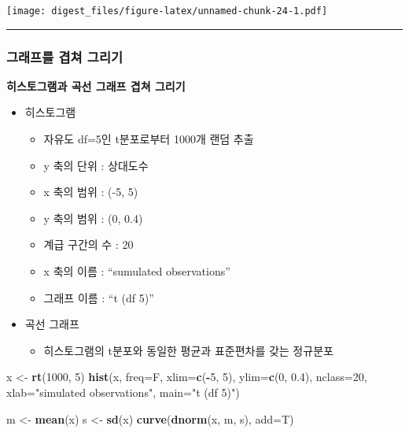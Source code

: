 \documentclass[]{article}
\newenvironment{Shaded}{\begin{snugshade}}{\end{snugshade}}
\newcommand{\KeywordTok}[1]{\textcolor[rgb]{0.13,0.29,0.53}{\textbf{#1}}}
\newcommand{\DataTypeTok}[1]{\textcolor[rgb]{0.13,0.29,0.53}{#1}}
\newcommand{\DecValTok}[1]{\textcolor[rgb]{0.00,0.00,0.81}{#1}}
\newcommand{\FloatTok}[1]{\textcolor[rgb]{0.00,0.00,0.81}{#1}}
\newcommand{\StringTok}[1]{\textcolor[rgb]{0.31,0.60,0.02}{#1}}
\newcommand{\OperatorTok}[1]{\textcolor[rgb]{0.81,0.36,0.00}{\textbf{#1}}}
\newcommand{\NormalTok}[1]{#1}
\providecommand{\tightlist}{%
  \setlength{\itemsep}{0pt}\setlength{\parskip}{0pt}}
\begin{document}
\texttt{[image: digest\_files/figure-latex/unnamed-chunk-24-1.pdf]}

\begin{center}\rule{0.5\linewidth}{\linethickness}\end{center}

\subsubsection{그래프를 겹쳐 그리기}\label{--}

\textbf{히스토그램과 곡선 그래프 겹쳐 그리기}

\begin{itemize}
\tightlist
\item
  히스토그램

  \begin{itemize}
  \tightlist
  \item
    자유도 df=5인 t분포로부터 1000개 랜덤 추출
  \item
    y 축의 단위 : 상대도수
  \item
    x 축의 범위 : (-5, 5)
  \item
    y 축의 범위 : (0, 0.4)
  \item
    계급 구간의 수 : 20
  \item
    x 축의 이름 : ``sumulated observations''
  \item
    그래프 이름 : ``t (df 5)''
  \end{itemize}
\item
  곡선 그래프

  \begin{itemize}
  \tightlist
  \item
    히스토그램의 t분포와 동일한 평균과 표준편차를 갖는 정규분포
  \end{itemize}
\end{itemize}

\begin{Shaded}
\begin{Highlighting}[]
\NormalTok{x <-}\StringTok{ }\KeywordTok{rt}\NormalTok{(}\DecValTok{1000}\NormalTok{, }\DecValTok{5}\NormalTok{)}
\KeywordTok{hist}\NormalTok{(x, }\DataTypeTok{freq=}\NormalTok{F, }\DataTypeTok{xlim=}\KeywordTok{c}\NormalTok{(}\OperatorTok{-}\DecValTok{5}\NormalTok{, }\DecValTok{5}\NormalTok{), }\DataTypeTok{ylim=}\KeywordTok{c}\NormalTok{(}\DecValTok{0}\NormalTok{, }\FloatTok{0.4}\NormalTok{), }\DataTypeTok{nclass=}\DecValTok{20}\NormalTok{, }\DataTypeTok{xlab=}\StringTok{"simulated observations"}\NormalTok{, }\DataTypeTok{main=}\StringTok{"t (df 5)"}\NormalTok{)}
  
\NormalTok{m <-}\StringTok{ }\KeywordTok{mean}\NormalTok{(x)}
\NormalTok{s <-}\StringTok{ }\KeywordTok{sd}\NormalTok{(x)}
\KeywordTok{curve}\NormalTok{(}\KeywordTok{dnorm}\NormalTok{(x, m, s), }\DataTypeTok{add=}\NormalTok{T)}
\end{Highlighting}
\end{Shaded}
\end{document}

